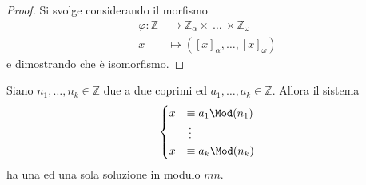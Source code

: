 \begin{proof}
	Si svolge considerando il morfismo
	\begin{align*}
	\varphi:\mathbb{Z}&\longrightarrow\mathbb{Z}_{\alpha}\times\ \dots \ \times\mathbb{Z}_{\omega}\\
	x&\longmapsto\left([x]_{\alpha},\dots,[x]_{\omega}\right)
	\end{align*}
	e dimostrando che è isomorfismo.
\end{proof}
\begin{teorema}
	Siano $n_1,\dots,n_k\in\mathbb{Z}$ due a due coprimi ed $a_1,\dots,a_k\in\mathbb{Z}$. Allora il sistema 
	\begin{equation*}
	\begin{cases}
	x&\equiv a_1\Mod(n_1)\\
	&\,\vdots\\
	x&\equiv a_k\Mod(n_k)
	\end{cases}
	\end{equation*}
	ha una ed una sola soluzione in modulo $mn$.
\end{teorema}






